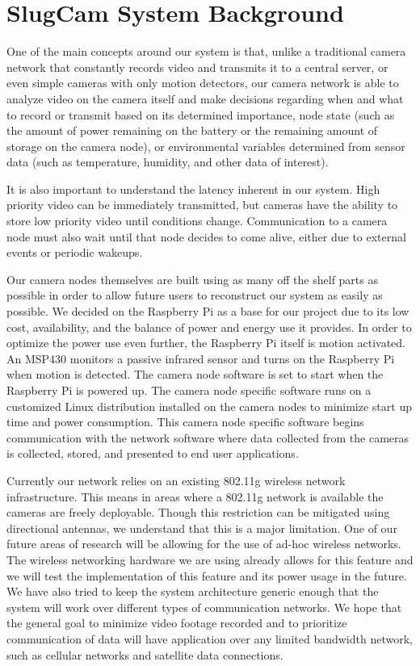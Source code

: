 \section{SlugCam System Background}

One of the main concepts around our system is that, unlike a traditional camera
network that constantly records video and transmits it to a central server, or
even simple cameras with only motion detectors, our camera network is able to
analyze video on the camera itself and make decisions regarding when and what to
record or transmit based on its determined importance, node state (such as the
amount of power remaining on the battery or the remaining amount of
storage on the camera node), or environmental variables determined from sensor
data (such as temperature, humidity, and other data of interest).

It is also important to understand the latency inherent in our system. High
priority video can be immediately transmitted, but cameras have the ability to
store low priority video until conditions change. Communication to a camera
node must also wait until that node decides to come alive, either due to
external events or periodic wakeups.

Our camera nodes themselves are built using as many off the shelf parts as
possible in order to allow future users to reconstruct our system as easily as
possible. We decided on the Raspberry Pi\cite{raspi_home} as a base for our
project due to its low cost, availability, and the balance of power and energy
use it provides. In order to optimize the power use even further, the Raspberry
Pi itself is motion activated. An MSP430 monitors a passive infrared sensor and
turns on the Raspberry Pi when motion is detected. The camera node software is
set to start when the Raspberry Pi is powered up. The camera node specific
software runs on a customized Linux distribution installed on the camera nodes
to minimize start up time and power consumption. This camera node specific
software begins communication with the network software where data collected
from the cameras is collected, stored, and presented to end user applications.

Currently our network relies on an existing 802.11g wireless network
infrastructure. This means in areas where a 802.11g network is available the
cameras are freely deployable. Though this restriction can be mitigated using
directional antennas, we understand that this is a major limitation. One of our
future areas of research will be allowing for the use of ad-hoc wireless
networks. The wireless networking hardware we are using already allows for this
feature and we will test the implementation of this feature and its power usage
in the future. We have also tried to keep the system architecture generic enough
that the system will work over different types of communication networks. We
hope that the general goal to minimize video footage recorded and to prioritize
communication of data will have application over any limited bandwidth network,
such as cellular networks and satellite data connections.

